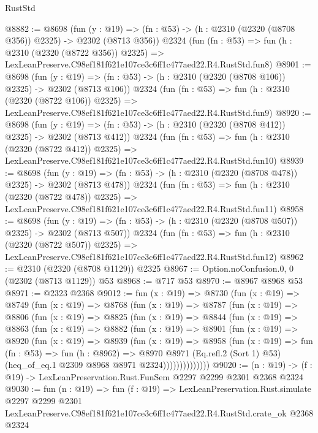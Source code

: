\begin{lexlean}{RustStd}
\begin{coremodule}
@8882 := @8698
    (fun (y : @19) => (fn : @53) -> (h : @2310 (@2320 (@8708 @356)) @2325) -> @2302 (@8713 @356))
    @2324
    (fun (fn : @53) =>
    fun (h : @2310 (@2320 (@8722 @356)) @2325) =>
    LexLeanPreserve.C98ef181f621e107ce3c6ff1c477aed22.R4.RustStd.fun8)
@8901 := @8698
    (fun (y : @19) => (fn : @53) -> (h : @2310 (@2320 (@8708 @106)) @2325) -> @2302 (@8713 @106))
    @2324
    (fun (fn : @53) =>
    fun (h : @2310 (@2320 (@8722 @106)) @2325) =>
    LexLeanPreserve.C98ef181f621e107ce3c6ff1c477aed22.R4.RustStd.fun9)
@8920 := @8698
    (fun (y : @19) => (fn : @53) -> (h : @2310 (@2320 (@8708 @412)) @2325) -> @2302 (@8713 @412))
    @2324
    (fun (fn : @53) =>
    fun (h : @2310 (@2320 (@8722 @412)) @2325) =>
    LexLeanPreserve.C98ef181f621e107ce3c6ff1c477aed22.R4.RustStd.fun10)
@8939 := @8698
    (fun (y : @19) => (fn : @53) -> (h : @2310 (@2320 (@8708 @478)) @2325) -> @2302 (@8713 @478))
    @2324
    (fun (fn : @53) =>
    fun (h : @2310 (@2320 (@8722 @478)) @2325) =>
    LexLeanPreserve.C98ef181f621e107ce3c6ff1c477aed22.R4.RustStd.fun11)
@8958 := @8698
    (fun (y : @19) => (fn : @53) -> (h : @2310 (@2320 (@8708 @507)) @2325) -> @2302 (@8713 @507))
    @2324
    (fun (fn : @53) =>
    fun (h : @2310 (@2320 (@8722 @507)) @2325) =>
    LexLeanPreserve.C98ef181f621e107ce3c6ff1c477aed22.R4.RustStd.fun12)
@8962 := @2310 (@2320 (@8708 @1129)) @2325
@8967 := Option.noConfusion.{0, 0} (@2302 (@8713 @1129)) @53
@8968 := @717 @53
@8970 := @8967 @8968 @53
@8971 := @2323 @2368
@9012 := fun (x : @19) =>
  @8730
    (fun (x : @19) =>
    @8749
      (fun (x : @19) =>
      @8768
        (fun (x : @19) =>
        @8787
          (fun (x : @19) =>
          @8806
            (fun (x : @19) =>
            @8825
              (fun (x : @19) =>
              @8844
                (fun (x : @19) =>
                @8863
                  (fun (x : @19) =>
                  @8882
                    (fun (x : @19) =>
                    @8901
                      (fun (x : @19) =>
                      @8920
                        (fun (x : @19) =>
                        @8939
                          (fun (x : @19) =>
                          @8958
                            (fun (x : @19) =>
                            fun (fn : @53) =>
                            fun (h : @8962) =>
                            @8970
                              @8971
                              (Eq.refl.{2} (Sort 1) @53)
                              (heq_of_eq.{1} @2309 @8968 @8971 @2324))))))))))))))
@9020 := (n : @19) -> (f : @19) -> LexLeanPreservation.Rust.FunSem @2297 @2299 @2301 @2368 @2324
@9030 := fun (n : @19) =>
  fun (f : @19) =>
  LexLeanPreservation.Rust.simulate
    @2297
    @2299
    @2301
    LexLeanPreserve.C98ef181f621e107ce3c6ff1c477aed22.R4.RustStd.crate_ok
    @2368
    @2324
\end{coremodule}
\end{lexlean}

